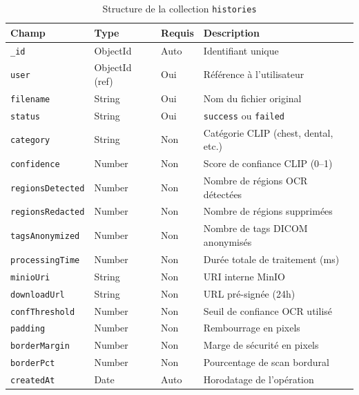 \begin{table}[H]
\centering
\caption{Structure de la collection \texttt{histories}}
\label{tab:collection_histories}
\begin{tabularx}{\textwidth}{p{3.5cm} p{2.5cm} p{1.8cm} X}
\toprule
\textbf{Champ} & \textbf{Type} & \textbf{Requis} & \textbf{Description} \\
\midrule
\texttt{\_id}             & ObjectId        & Auto & Identifiant unique \\
\texttt{user}             & ObjectId (ref)  & Oui  & Référence à l'utilisateur \\
\texttt{filename}         & String          & Oui  & Nom du fichier original \\
\texttt{status}           & String          & Oui  & \texttt{success} ou \texttt{failed} \\
\texttt{category}         & String          & Non  & Catégorie CLIP (chest, dental, etc.) \\
\texttt{confidence}       & Number          & Non  & Score de confiance CLIP (0--1) \\
\texttt{regionsDetected}  & Number          & Non  & Nombre de régions OCR détectées \\
\texttt{regionsRedacted}  & Number          & Non  & Nombre de régions supprimées \\
\texttt{tagsAnonymized}   & Number          & Non  & Nombre de tags DICOM anonymisés \\
\texttt{processingTime}   & Number          & Non  & Durée totale de traitement (ms) \\
\texttt{minioUri}         & String          & Non  & URI interne MinIO \\
\texttt{downloadUrl}      & String          & Non  & URL pré-signée (24h) \\
\texttt{confThreshold}    & Number          & Non  & Seuil de confiance OCR utilisé \\
\texttt{padding}          & Number          & Non  & Rembourrage en pixels \\
\texttt{borderMargin}     & Number          & Non  & Marge de sécurité en pixels \\
\texttt{borderPct}        & Number          & Non  & Pourcentage de scan bordural \\
\texttt{createdAt}        & Date            & Auto & Horodatage de l'opération \\
\bottomrule
\end{tabularx}
\end{table}

